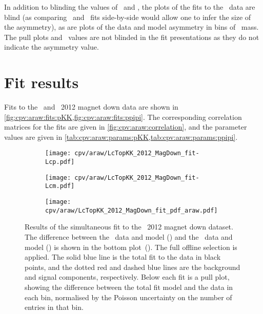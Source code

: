 In addition to blinding the values of \ARaw\ and \dACP, the plots of the fits
to the \APLambdac\ data are blind (as comparing \PLambdac\ and \APLambdac\ fits
side-by-side would allow one to infer the size of the asymmetry), as are plots
of the data and model asymmetry in bins of \PLambdac\ mass.
The pull plots and \chisq\ values are not blinded in the fit presentations as
they do not indicate the asymmetry value.

\section{Fit results}
\label{chap:cpv:araw:results}

Fits to the \pKK\ and \ppipi\ 2012 magnet down data are shown in
\cref{fig:cpv:araw:fits:pKK,fig:cpv:araw:fits:ppipi}.
The corresponding correlation matrices for the fits are given in
\cref{fig:cpv:araw:correlation}, and the parameter values are given in
\cref{tab:cpv:araw:params:pKK,tab:cpv:araw:params:ppipi}.

\begin{figure}
  \begin{subfigure}[b]{0.5\textwidth}
    \texttt{[image: cpv/araw/LcTopKK\_2012\_MagDown\_fit-Lcp.pdf]}
    \caption{\PLambdac}
    \label{fig:cpv:araw:fits:pKK:Lcp}
  \end{subfigure}
  \begin{subfigure}[b]{0.5\textwidth}
    \texttt{[image: cpv/araw/LcTopKK\_2012\_MagDown\_fit-Lcm.pdf]}
    \caption{\APLambdac}
    \label{fig:cpv:araw:fits:pKK:Lcm}
  \end{subfigure}
  \begin{subfigure}[b]{0.5\textwidth}
    \texttt{[image: cpv/araw/LcTopKK\_2012\_MagDown\_fit\_pdf\_araw.pdf]}
    \caption{\ARaw}
    \label{fig:cpv:araw:fits:pKK:ARaw}
  \end{subfigure}
  \caption{%
    Results of the simultaneous fit to the \pKK\ 2012 magnet down dataset.
    The difference between the \PLambdac\ data and model
    () and the \APLambdac\ data and model
    () is shown in the bottom
    plot~().
    The full offline selection is applied.
    The solid blue line is the total fit to the data in black points, and the
    dotted red and dashed blue lines are the background and signal components,
    respectively.
    Below each fit is a pull plot, showing the difference between the total fit
    model and the data in each bin, normalised by the Poisson uncertainty on
    the number of entries in that bin.
  }
  \label{fig:cpv:araw:fits:pKK}
\end{figure}

